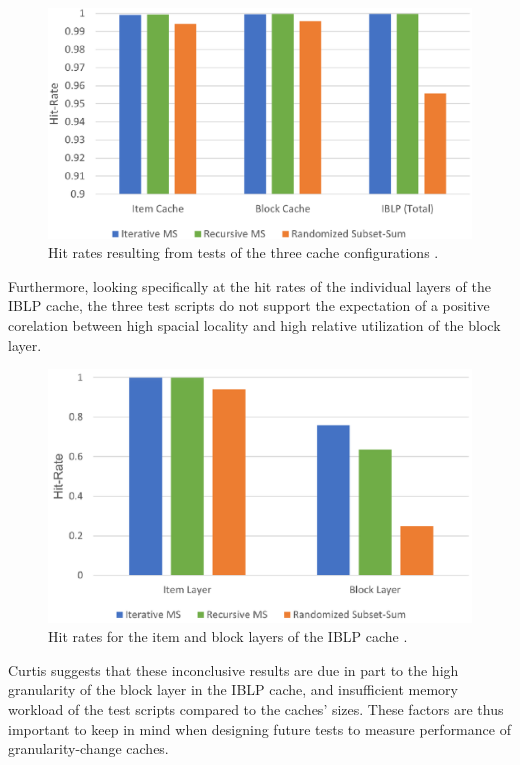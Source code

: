 \documentclass[12pt,twoside]{reedthesis}
\begin{document}
	\begin{figure}[h]
		\centering
		\includegraphics[width=4.8in]{figures/curtis_cache_hit_rates.png}
		\caption{Hit rates resulting from tests of the three cache configurations \cite{curtis}.}
	\end{figure}

	Furthermore, looking specifically at the hit rates of the individual layers of the IBLP cache, the three test scripts do not support the expectation of a positive corelation between high spacial locality and high relative utilization of the block layer.

	\begin{figure}[h]
		\centering
		\includegraphics[width=4.5in]{figures/curtis_layer_hit_rates.png}
		\caption{Hit rates for the item and block layers of the IBLP cache \cite{curtis}.}
	\end{figure}

	Curtis suggests that these inconclusive results are due in part to the high granularity of the block layer in the IBLP cache, and insufficient memory workload of the test scripts compared to the caches' sizes. These factors are thus important to keep in mind when designing future tests to measure performance of granularity-change caches.
\end{document}
